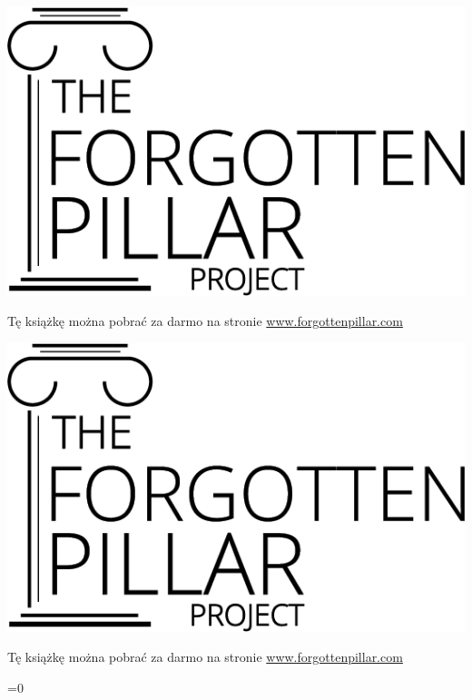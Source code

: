 {\ifepub
    \includegraphics[width=\linewidth]{images/logo-black.png}

    Tę książkę można pobrać za darmo na stronie \href{https://forgottenpillar.com/book/the-forgotten-pillar}{www.forgottenpillar.com}
\else
    \noindent
    \begin{minipage}{0.3\textwidth}
        \includegraphics[width=\linewidth]{images/logo-black.png}
    \end{minipage}%
    \hfill
    \begin{minipage}{\dimexpr\linewidth-0.3\textwidth-0.125\textwidth-1em\relax}
        \raggedleft\footnotesize
        Tę książkę można pobrać za darmo na stronie \href{https://forgottenpillar.com/book/the-forgotten-pillar?lang=\currentlang&type=\currentlayout}{www.forgottenpillar.com}
    \end{minipage}%
    \ifnum{}=0
    \else
        \hfill
        \begin{minipage}{0.125\textwidth}
            \centering
        \end{minipage}
    \fi%
\fi
}

\pagebreak